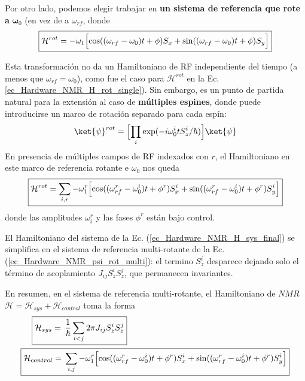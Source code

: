 \documentclass[a4paper,11pt]{book} %
\numberwithin{equation}{chapter}
\def\Lc{\Bigl[}
\def\Rc{\Bigr]}
\begin{document}
Por otro lado, podemos elegir trabajar en \textbf{un sistema de referencia que rote a} $\bm \omega_0$ (en vez de a $\omega_{rf}$, donde
	\begin{equation}
	\boxed{\mathcal{H}^{rot} = - \omega_1 \Lc \cos ((\omega_{rf} - \omega_0)t + \phi) S_x + \sin ((\omega_{rf} - \omega_0)t + \phi) S_y \Rc}
	\end{equation}

Esta transformación no da un Hamiltoniano de RF independiente del tiempo (a menos que $\omega_{rf} = \omega_0$), como fue el caso para $\mathcal{H}^{rot}$ en la Ec. \ref{ec_Hardware_NMR_H_rot_single}). Sin embargo, es un punto de partida natural para la extensión al caso de \textbf{múltiples espines}, donde puede introducirse un marco de rotación separado para cada espín:
	\begin{equation} \label{ec_Hardware_NMR_psi_rot_multi}
	\ket{\psi}^{rot} = \Lc \prod_i \exp (-i \omega_0^i t S^i_z/\hbar ) \Rc \ket{\psi}
	\end{equation}
En presencia de múltiples campos de RF indexados con $r$, el Hamiltoniano en este marco de referencia rotante e $\omega_0$ nos queda
	\begin{equation}
	\boxed{\mathcal{H}^{rot} = \sum_{i,r} - \omega_1^r \Lc \cos ((\omega_{rf}^r - \omega_0^i)t + \phi^r) S_x^i + \sin ((\omega_{rf}^r - \omega_0^i) t +\phi^r) S_y^i  \Rc}
	\end{equation}
donde las amplitudes $\omega_i^r$ y las fases $\phi^r$ están bajo control. 

El Hamiltoniano del sistema de la Ec. (\ref{ec_Hardware_NMR_H_sys_final}) se simplifica en el sistema de referencia multi-rotante de la Ec. (\ref{ec_Hardware_NMR_psi_rot_multi}): el termino $S_z^i$ desparece dejando solo el término de acoplamiento $J_{ij} S_z^i S_z^j$, que permanecen invariantes.

En resumen, en el sistema de referencia multi-rotante, el Hamiltoniano de $NMR$ $\mathcal{H} = \mathcal{H}_{sys} + \mathcal{H}_{control}$ toma la forma
	\begin{align} 
	& ~~~~ \boxed{ \mathcal{H}_{sys} =  \, \frac{1}{\hbar} \sum_{i<j} 2 \pi J_{ij} S_z^i S_z^j} \label{ec_Hardware_NMR_H_sys_final_multi_rot} \\
	&\boxed{\mathcal{H}_{control} =  \, \sum_{i,j} - \omega_1^r \Lc \cos ((\omega_{rf}^r - \omega_0^i)t +\phi^r) S_x^i + \sin ((\omega_{rf}^r-\omega_0^i)t +\phi^r) S^i_y \Rc} \label{ec_Hardware_NMR_H_control_final_multi_rot}
	\end{align}
\end{document}
